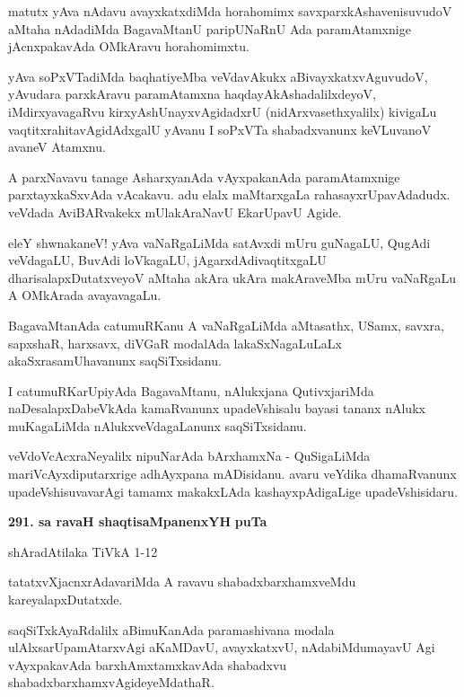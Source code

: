 matutx yAva nAdavu avayxkatxdiMda horahomimx savxparxkAshavenisuvudoV aMtaha nAdadiMda Baga\-vaMtanU paripUNaRnU Ada paramAtamxnige jAcnxpakavAda OMkAravu horahomimxtu.

yAva soPxVTadiMda baqhatiyeMba veVdavAkukx aBivayxkatxvAguvudoV, yAvudara parxkAravu para\-mAtamxna haqdayAkAshadalilxdeyoV, iMdirxyavagaRvu kirxyA\break\-shUnayxvAgidadxrU (nidArxvasethxyalilx) kivi\-gaLu vaqtitxrahitavAgidAdxgalU yAvanu I soPxVTa shabadxvanunx keVLuvanoV avaneV Atamxnu.

A parxNavavu tanage AsharxyanAda vAyxpakanAda paramAtamxnige parxtayxkaSxvAda vAcakavu. adu elalx maMtarx\-gaLa rahasayxrUpavAdadudx. veVdada AviBARvakekx mUlakAraNavU EkarUpavU Agide.

eleY shwnakaneV! yAva vaNaRgaLiMda satAvxdi mUru guNagaLU, QugAdi veVdagaLU, BuvAdi loVkagaLU, jAgarxdAdivaqtitxgaLU dharisalapxDutatxveyoV aMtaha akAra ukAra makAraveMba mUru vaNaRgaLu A OMkArada avayavagaLu.

BagavaMtanAda catumuRKanu A vaNaRgaLiMda aMtasathx, USamx, savxra, sapxshaR, harxsavx, diVGaR moda\-lAda lakaSxNagaLuLaLx akaSxrasamUhavanunx saqSiTxsidanu.

I catumuRKarUpiyAda BagavaMtanu, nAlukxjana QutivxjariMda naDesalapxDa\-beVkAda kamaR\-vanunx upadeVshisalu bayasi tananx nAlukx muKagaLiMda nAlukxveVda\-gaLanunx saqSiTxsidanu.

veVdoVcAcxraNeyalilx nipuNarAda bArxhamxNa - QuSigaLiMda mariVcAyxdiputarxrige adhAyxpana mADisi\-danu. avaru veYdika dhamaRvanunx upadeVshisuvavarAgi tamamx makakxLAda kashayxpAdigaLige upadeVshisidaru.


\medskip
\noindent
\textbf{291. sa ravaH shaqtisaMpanenxYH} \hfill {\bf puTa \pageref{151}}

\hfill shAradAtilaka TiVkA 1-12

\smallskip
tatatxvXjacnxrAdavariMda A ravavu shabadxbarxhamxveMdu kareyalapxDutatxde.

saqSiTxkAyaRdalilx aBimuKanAda paramashivana modala ulAlxsarUpamAtarx\-vAgi aKaMDavU, avayx\-katxvU, nAdabiMdumayavU Agi vAyxpakavAda barxhAmxtamxka\-vAda shabadxvu shabadxbarxhamxvAgideyeMdathaR.

